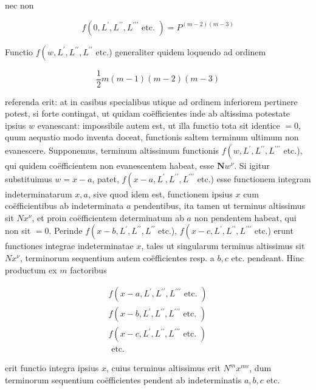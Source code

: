 \documentclass[10pt]{article}
\begin{document}
nec non

\[
f\left(0, L^{\prime}, L^{\prime \prime}, L^{\prime \prime \prime} \text { etc. }\right)=P^{(m-2)(m-3)}
\]

Functio \(f\left(w, L^{\prime}, L^{\prime \prime}, L^{\prime \prime}\right.\) etc.) generaliter quidem loquendo ad ordinem

\[
\frac{1}{2} m(m-1)(m-2)(m-3)
\]

referenda erit: at in casibus specialibus utique ad ordinem inferiorem pertinere potest, si forte contingat, ut quidam coëfficientes inde ab altissima potestate ipsius \(w\) evanescant: impossibile autem est, ut illa functio tota sit identice \(=0\), quum
aequatio modo inventa doceat, functionis saltem terminum ultimum non evanescere. Supponemus, terminum altissimum functionis \(f\left(w, L^{\prime}, L^{\prime \prime}, L^{\prime \prime \prime}\right.\) etc.), qui quidem coëfficientem non evanescentem habeat, esse \(\boldsymbol{N} w^{\nu}\). Si igitur substituimus \(w=x-a\), patet, \(f\left(x-a, L^{\prime}, L^{\prime \prime}, L^{\prime \prime \prime}\right.\) etc.) esse functionem integram indeterminatarum \(x, a\), sive quod idem est, functionem ipsius \(x\) cum coëfficientibus ab indeterminata \(a\) pendentibus, ita tamen ut terminus altissimus sit \(N x^{\nu}\), et proin coëfficientem determinatum ab \(a\) non pendentem habeat, qui non sit \(=0\). Perinde \(f\left(x-b, L^{\prime}, L^{\prime \prime}, L^{\prime \prime}\right.\) etc.), \(f\left(x-c, L^{\prime}, L^{\prime \prime}, L^{\prime \prime \prime}\right.\) etc.) erunt functiones integrae indeterminatae \(x\), tales ut singularum terminus altissimus sit \(N x^{\nu}\), terminorum sequentium autem coëfficientes resp. a \(b, c\) etc. pendeant. Hinc productum ex \(m\) factoribus

\[
\begin{gathered}
f\left(x-a, L^{\prime}, L^{\prime \prime}, L^{\prime \prime \prime} \text { etc. }\right) \\
f\left(x-b, L^{\prime}, L^{\prime \prime}, L^{\prime \prime \prime} \text { etc. }\right) \\
f\left(x-c, L^{\prime}, L^{\prime \prime}, L^{\prime \prime \prime} \text { etc. }\right) \\
\text { etc. }
\end{gathered}
\]

erit functio integra ipsius \(x\), cuius terminus altissimus erit \(N^{m} x^{m v}\), dum terminorum sequentium coëfficientes pendent ab indeterminatis \(a, b, c\) etc.
\end{document}
